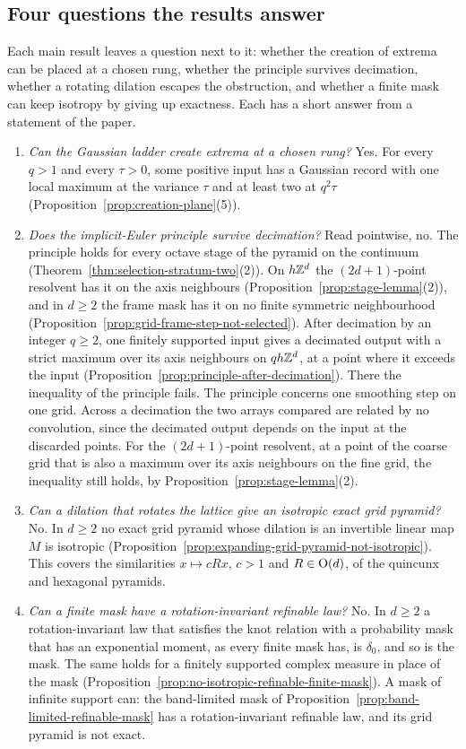 \subsection{Four questions the results answer}

Each main result leaves a question next to it: whether the creation of extrema can be placed at a
chosen rung, whether the principle survives decimation, whether a rotating dilation escapes the
obstruction, and whether a finite mask can keep isotropy by giving up exactness. Each has a short
answer from a statement of the paper.
\begin{enumerate}
\item \emph{Can the Gaussian ladder create extrema at a chosen rung?} Yes. For every $q > 1$ and
every $\tau > 0$, some positive input has a Gaussian record with one local maximum at the variance
$\tau$ and at least two at $q^2\tau$ (Proposition~\ref{prop:creation-plane}(5)).
\item \emph{Does the implicit-Euler principle survive decimation?} Read pointwise, no. The principle
holds for every octave stage of the \Matern{} pyramid on the continuum
(Theorem~\ref{thm:selection-stratum-two}(2)). On $h\mathbb{Z}^d$ the $(2d+1)$-point resolvent has it on
the axis neighbours (Proposition~\ref{prop:stage-lemma}(2)), and in $d \ge 2$ the frame mask has it
on no finite symmetric neighbourhood (Proposition~\ref{prop:grid-frame-step-not-selected}). After
decimation by an integer $q \ge 2$, one finitely supported input gives a decimated output with a
strict maximum over its axis neighbours on $qh\mathbb{Z}^d$, at a point where it exceeds the input
(Proposition~\ref{prop:principle-after-decimation}). There the inequality of the principle fails.
The principle concerns one smoothing step on one grid. Across a decimation the two arrays compared
are related by no convolution, since the decimated output depends on the input at the discarded
points. For the $(2d+1)$-point resolvent, at a point of the coarse grid that is also a maximum
over its axis neighbours on the fine grid, the inequality still holds, by
Proposition~\ref{prop:stage-lemma}(2).
\item \emph{Can a dilation that rotates the lattice give an isotropic exact grid pyramid?} No. In
$d \ge 2$ no exact grid pyramid whose dilation is an invertible linear map $M$ is isotropic
(Proposition~\ref{prop:expanding-grid-pyramid-not-isotropic}). This covers the similarities
$x \mapsto cRx$, $c > 1$ and $R \in \mathrm{O}(d)$, of the quincunx and hexagonal pyramids.
\item \emph{Can a finite mask have a rotation-invariant refinable law?} No. In $d \ge 2$ a
rotation-invariant law that satisfies the knot relation with a probability mask that has an
exponential moment, as every finite mask has, is $\delta_0$, and so is the mask. The same holds for a
finitely supported complex measure in place of the mask
(Proposition~\ref{prop:no-isotropic-refinable-finite-mask}). A mask of infinite support can: the
band-limited mask of Proposition~\ref{prop:band-limited-refinable-mask} has a rotation-invariant
refinable law, and its grid pyramid is not exact.
\end{enumerate}
